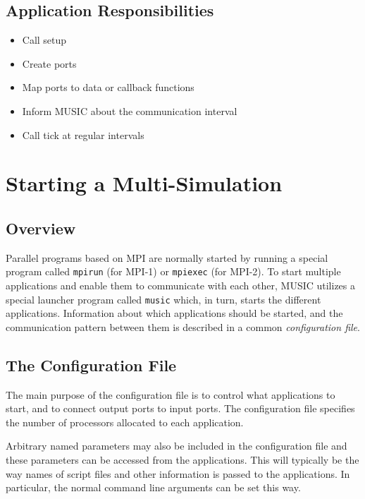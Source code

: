 \documentclass[a4paper]{report}
\begin{document}
\section{Application Responsibilities}

\begin{itemize}
\item Call setup
\item Create ports
\item Map ports to data or callback functions
\item Inform MUSIC about the communication interval
\item Call tick at regular intervals
\end{itemize}


\chapter{Starting a Multi-Simulation}

\section{Overview}

Parallel programs based on MPI are normally started by running a
special program called \texttt{mpirun} (for MPI-1) or \texttt{mpiexec}
(for MPI-2).  To start multiple applications and enable them to
communicate with each other, MUSIC utilizes a special launcher program
called \texttt{music} which, in turn, starts the
different applications.  Information about which applications should
be started, and the communication pattern between them is described in
a common \emph{configuration file}.


\section{The Configuration File}

The main purpose of the configuration file is to control what
applications to start, and to connect output ports to input ports.
The configuration file specifies the number of processors allocated to
each application.

Arbitrary named parameters may also be included in the configuration
file and these parameters can be accessed from the applications.  This
will typically be the way names of script files and other information
is passed to the applications.  In particular, the normal command line
arguments can be set this way.
\end{document}
